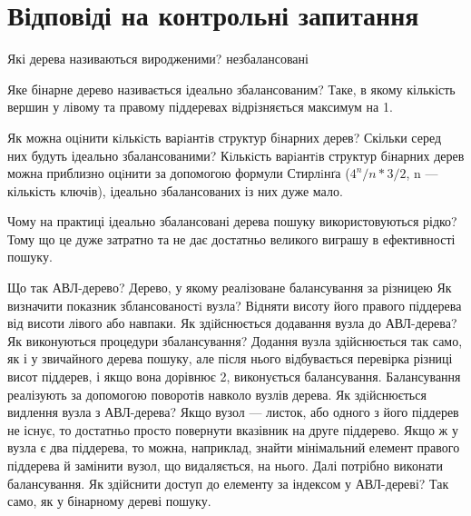 \documentclass[a4paper, 12pt, oneside]{extarticle}
\begin{document}
\section*{Відповіді на контрольні запитання}
\begin{itemize}
	\question Які дерева називаються виродженими?
	\answer незбалансовані

	\question Яке бінарне дерево називається ідеально збалансованим?
	\answer Таке, в якому кількість вершин у лівому та правому піддеревах відрізняється максимум на 1.

	\question Як можна оцiнити кiлькiсть варiантiв структур бiнарних дерев? Скільки серед них будуть ідеально збалансованими?
		\answer Кiлькiсть варiантiв структур бiнарних дерев можна приблизно оцiнити за допомогою формули Стирлiнґа ($4^n/n*3/2$, n --- кількість ключів), ідеально збалансованих із них дуже мало.

	\question Чому на практиці ідеально збалансовані дерева пошуку використовуються рідко?
	\answer Тому що це дуже затратно та не дає достатньо великого виграшу в ефективності пошуку.

	\question Що так АВЛ-дерево?
	\answer Дерево, у якому реалізоване балансування за різницею
	\question Як визначити показник зблансованостi вузла?
	\answer Відняти висоту його правого піддерева від висоти лівого або навпаки.
	\question Як здiйснюється додавання вузла до АВЛ-дерева? Як виконуються процедури збалансування?
	\answer Додання вузла здійснюється так само, як і у звичайного дерева пошуку, але після нього
		відбувається перевірка різниці висот піддерев, і якщо вона дорівнює 2, виконується балансування.
		Балансування реалізують за допомогою поворотів навколо вузлів дерева.
	\question Як здiйснюється видлення вузла з АВЛ-дерева?
		\answer Якщо вузол --- листок, або одного з його піддерев не існує, то достатньо просто повернути вказівник на друге піддерево. Якщо ж у вузла є два піддерева, то можна, наприклад, знайти мінімальний елемент правого піддерева й замінити вузол, що видаляється, на нього. Далі потрібно виконати балансування.
	\question Як здійснити доступ до елементу за індексом у АВЛ-дереві?
	\answer Так само, як у бінарному дереві пошуку.
\end{itemize}
\end{document}
